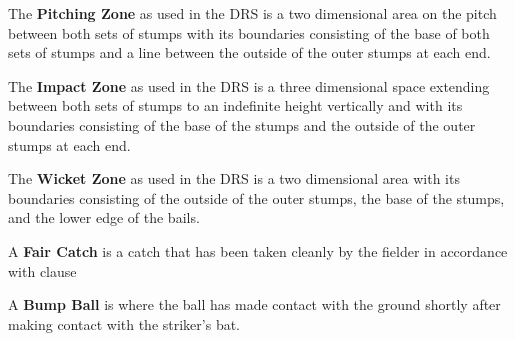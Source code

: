\documentclass[12pt]{article}
\begin{document}
\vspace{\baselineskip}
\begin{adjustwidth}{0.4in}{0.17in}
\begin{justify}
{\fontsize{9pt}{10.8pt} \tabto{0.39in} The \textbf{Pitching Zone} as used in the DRS is a two dimensional area on the pitch between both sets of stumps with its boundaries consisting of the base of both sets of stumps and a line between the outside of the outer stumps at each end.\par}
\end{justify}\par

\end{adjustwidth}


\vspace{\baselineskip}
\begin{adjustwidth}{0.4in}{0.04in}
{\fontsize{9pt}{10.8pt} \tabto{0.39in} The \textbf{Impact Zone} as used in the DRS is a three dimensional space extending between both sets of stumps to an indefinite height vertically and with its boundaries consisting of the base of the stumps and the outside of the outer stumps at each end.\par}\par

\end{adjustwidth}


\vspace{\baselineskip}
\begin{adjustwidth}{0.4in}{0.11in}
{\fontsize{9pt}{10.8pt} \tabto{0.39in} The \textbf{Wicket Zone} as used in the DRS is a two dimensional area with its boundaries consisting of the outside of the outer stumps, the base of the stumps, and the lower edge of the bails.\par}\par

\end{adjustwidth}


\vspace{\baselineskip}
{\fontsize{9pt}{10.8pt} \tabto{0.39in} A \textbf{Fair Catch} is a catch that has been taken cleanly by the fielder in accordance with clause \par}\par


\vspace{\baselineskip}
\begin{adjustwidth}{0.4in}{0.01in}
{\fontsize{9pt}{10.8pt} \tabto{0.39in} A \textbf{Bump Ball} is where the ball has made contact with the ground shortly after making contact with the striker’s bat.\par}\par

\end{adjustwidth}
\end{document}
